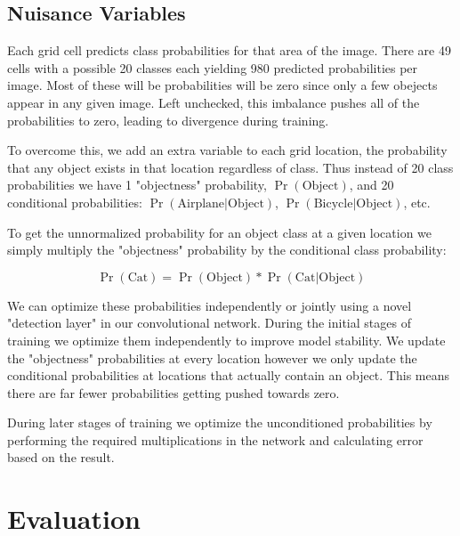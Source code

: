 \documentclass{article} %
\begin{document}
\subsection{Nuisance Variables}

Each grid cell predicts class probabilities for that area of the image. There are 49 cells with a possible 20 classes each yielding 980 predicted probabilities per image. Most of these will be probabilities will be zero since only a few obejects appear in any given image. Left unchecked, this imbalance pushes all of the probabilities to zero, leading to divergence during training.

To overcome this, we add an extra variable to each grid location, the probability that any object exists in that location regardless of class. Thus instead of 20 class probabilities we have 1 "objectness" probability, $\Pr(\textrm{Object})$, and 20 conditional probabilities: $\Pr(\textrm{Airplane} | \textrm{Object})$, $\Pr(\textrm{Bicycle} | \textrm{Object})$, etc.

To get the unnormalized probability for an object class at a given location we simply multiply the "objectness" probability by the conditional class probability:

\begin{equation}
\Pr(\textrm{Cat}) = \Pr(\textrm{Object}) * \Pr(\textrm{Cat} | \textrm{Object})
\end{equation}

We can optimize these probabilities independently or jointly using a novel "detection layer" in our convolutional network. During the initial stages of training we optimize them independently to improve model stability. We update the "objectness" probabilities at every location however we only update the conditional probabilities at locations that actually contain an object. This means there are far fewer probabilities getting pushed towards zero. 

During later stages of training we optimize the unconditioned probabilities by performing the required multiplications in the network and calculating error based on the result.

\section{Evaluation}
\end{document}
